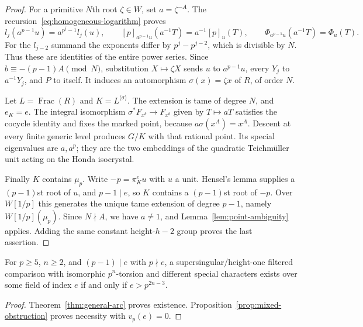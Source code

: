 \begin{proof}
For a primitive $N$th root $\zeta\in W$, set $a=\zeta^{-A}$. The recursion~\eqref{eq:homogeneous-logarithm} proves
\[
 l_j(a^{p-1}u)=a^{p^j-1}l_j(u),\qquad
 [p]_{a^{p-1}u}(a^{-1}T)=a^{-1}[p]_u(T),\qquad
 \Phi_{a^{p-1}u}(a^{-1}T)=\Phi_u(T).
\]
For the $l_{j-2}$ summand the exponents differ by $p^j-p^{j-2}$, which is divisible by $N$. Thus these are identities of the entire power series. Since $b\equiv-(p-1)A\pmod N$, substitution $X\mapsto\zeta X$ sends $u$ to $a^{p-1}u$, every $Y_j$ to $a^{-1}Y_j$, and $P$ to itself. It induces an automorphism $\sigma(x)=\zeta x$ of $R$, of order $N$.

Let $L=\operatorname{Frac}(R)$ and $K=L^{\langle\sigma\rangle}$. The extension is tame of degree $N$, and $e_K=e$. The integral isomorphism $\sigma^*F_{x^b}\to F_{x^b}$ given by $T\mapsto aT$ satisfies the cocycle identity and fixes the marked point, because $a\sigma(x^A)=x^A$. Descent at every finite generic level produces $G/K$ with that rational point. Its special eigenvalues are $a,a^p$; they are the two embeddings of the quadratic Teichm\"uller unit acting on the Honda isocrystal.

Finally $K$ contains $\mu_p$. Write $-p=\pi_K^e u$ with $u$ a unit. Hensel's lemma supplies a $(p-1)$st root of $u$, and $p-1\mid e$, so $K$ contains a $(p-1)$st root of $-p$. Over $W[1/p]$ this generates the unique tame extension of degree $p-1$, namely $W[1/p](\mu_p)$. Since $N\nmid A$, we have $a\ne1$, and Lemma~\ref{lem:point-ambiguity} applies. Adding the same constant height-$h-2$ group proves the last assertion.
\end{proof}

\begin{corollary}\label{cor:sharp-mixed-prime}
For $p\ge5$, $n\ge2$, and $(p-1)\mid e$ with $p\nmid e$, a supersingular/height-one filtered comparison with isomorphic $p^n$-torsion and different special characters exists over some field of index $e$ if and only if $e>p^{2n-3}$.
\end{corollary}
\begin{proof}
Theorem~\ref{thm:general-arc} proves existence. Proposition~\ref{prop:mixed-obstruction} proves necessity with $v_p(e)=0$.
\end{proof}

